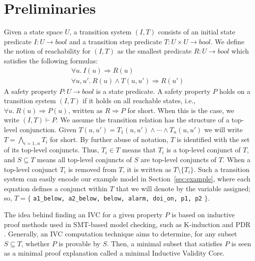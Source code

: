 \section{Preliminaries}
\label{sec:background}

\newcommand{\bool}[0]{\mathit{bool}}
\newcommand{\reach}[0]{\mathit{R}}
\newcommand{\ite}[3]{\mathit{if}\ {#1}\ \mathit{then}\ {#2}\ \mathit{else}\ {#3}}

Given a state space $U$, a transition system $(I,T)$ consists of an
initial state predicate $I : U \to \bool$ and a transition step
predicate $T : U \times U \to \bool$.
We define the notion of
reachability for $(I, T)$ as the smallest predicate $\reach : U \to
\bool$ which satisfies the following formulas:
\begin{gather*}
  \forall u.~ I(u) \Rightarrow \reach(u) \\
  \forall u, u'.~ \reach(u) \land T(u, u') \Rightarrow \reach(u')
\end{gather*}
A safety property $P : U \to \bool$ is a state predicate. A safety
property $P$ holds on a transition system $(I, T)$ if it holds on all
reachable states, i.e., $\forall u.~ \reach(u) \Rightarrow P(u)$,
written as $\reach \Rightarrow P$ for short. When this is the case, we
write $(I, T)\vdash P$. We assume the transition relation has the structure of a top-level conjunction.  Given $T(u, u') = T_1(u, u') \land \cdots \land T_n(u, u')$ we will write $T = \bigwedge_{i=1..n}T_i$ for short.
By further abuse of notation,
$T$ is identified with the set of its top-level conjuncts. Thus, $T_i \in
T$ means that $T_i$ is a top-level conjunct of $T$, and $S
\subseteq T$ means all top-level conjuncts of $S$ are top-level
conjuncts of $T$. When a top-level conjunct $T_i$ is removed from $T$, it is written as $T \setminus \{T_i\}$. Such a transition system can easily encode our example model in Section~\ref{sec:example}, where each equation defines a conjunct within $T$ that we will denote by the variable assigned; so, $T = \{$ {\small \texttt{a1\_below, a2\_below, below, alarm, doi\_on, p1, p2}} $\}$.

The idea behind finding an IVC for a given property $P$ \cite{Ghass16} is based on inductive proof methods used in SMT-based model checking, such as K-induction and PDR \cite{NFM2012:KaGaTiWh, amla2005analysis, Een2011:PDR}. Generally, an IVC computation technique aims to determine, for any subset $S \subseteq T$, whether $P$ is provable by $S$. Then, a minimal subset that satisfies $P$ is seen as a minimal proof explanation called a minimal Inductive Validity Core.

